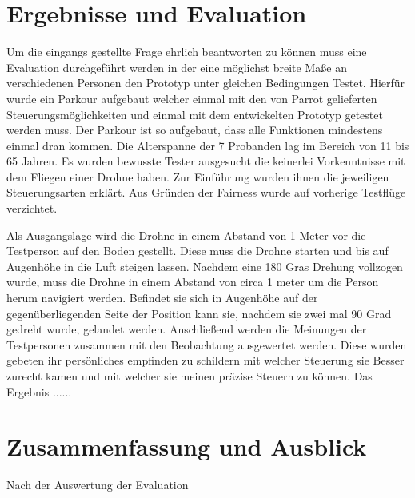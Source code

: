 \documentclass{article}
\begin{document}
\section{Ergebnisse und Evaluation}
Um die eingangs gestellte Frage ehrlich beantworten zu können muss eine Evaluation durchgeführt werden in der eine möglichst breite Maße an verschiedenen Personen den Prototyp unter gleichen Bedingungen Testet. Hierfür wurde ein Parkour aufgebaut welcher einmal mit den von Parrot gelieferten Steuerungsmöglichkeiten und einmal mit dem entwickelten Prototyp getestet werden muss. Der Parkour ist so aufgebaut, dass alle Funktionen mindestens einmal dran kommen. 
Die Alterspanne der 7 Probanden lag im Bereich von 11 bis 65 Jahren. Es wurden bewusste Tester ausgesucht die keinerlei Vorkenntnisse mit dem Fliegen einer Drohne haben. 
Zur Einführung wurden ihnen die jeweiligen Steuerungsarten erklärt. Aus Gründen der Fairness wurde auf vorherige Testflüge verzichtet.

Als Ausgangslage wird die Drohne in einem Abstand von 1 Meter vor die Testperson auf den Boden gestellt. Diese muss die Drohne starten und bis auf Augenhöhe in die Luft steigen lassen. Nachdem eine 180 Gras Drehung vollzogen wurde, muss die Drohne in einem Abstand von circa 1 meter um die Person herum navigiert werden. Befindet sie sich in Augenhöhe auf der gegenüberliegenden Seite der Position kann sie, nachdem sie zwei mal 90 Grad gedreht wurde, gelandet werden.
Anschließend werden die Meinungen der Testpersonen zusammen mit den Beobachtung ausgewertet werden. Diese wurden gebeten ihr persönliches empfinden zu schildern mit welcher Steuerung sie Besser zurecht kamen und mit welcher sie meinen präzise Steuern zu können.
Das Ergebnis ......
\section{Zusammenfassung und Ausblick}
Nach der Auswertung der Evaluation 
{}

\end{document}
